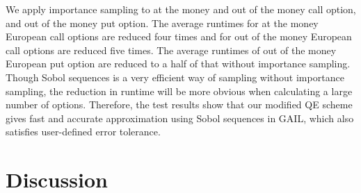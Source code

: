 \documentclass{ws-ijfe}
\begin{document}
We apply importance sampling to at the money and out of the money call option, and out of the money put option. The average runtimes for at the money European call options are reduced four times and for out of the money European call options are reduced five times. The average runtimes of out of the money European put option are reduced to a half of that without importance sampling. Though Sobol sequences is a very efficient way of sampling without importance sampling, the reduction in runtime will be more obvious when calculating a large number of options. Therefore, the test results show that our modified QE scheme gives fast and accurate approximation using Sobol sequences in GAIL, which also satisfies user-defined error tolerance.

\section{Discussion}

\newpage










\end{document}
